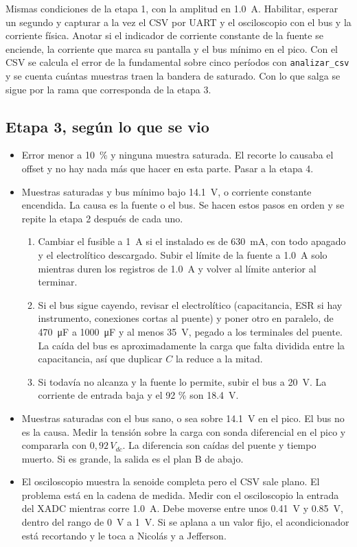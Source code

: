 \documentclass[11pt,a4paper]{article}
\begin{document}
Mismas condiciones de la etapa 1, con la amplitud en \SI{1.0}{A}. Habilitar, esperar un segundo y capturar a la vez el CSV por UART y el osciloscopio con el bus y la corriente física. Anotar si el indicador de corriente constante de la fuente se enciende, la corriente que marca su pantalla y el bus mínimo en el pico. Con el CSV se calcula el error de la fundamental sobre cinco períodos con \texttt{analizar\_csv} y se cuenta cuántas muestras traen la bandera de saturado. Con lo que salga se sigue por la rama que corresponda de la etapa 3.

\subsection*{Etapa 3, según lo que se vio}

\begin{itemize}
\item Error menor a \SI{10}{\percent} y ninguna muestra saturada. El recorte lo causaba el offset y no hay nada más que hacer en esta parte. Pasar a la etapa 4.
\item Muestras saturadas y bus mínimo bajo \SI{14.1}{V}, o corriente constante encendida. La causa es la fuente o el bus. Se hacen estos pasos en orden y se repite la etapa 2 después de cada uno.
  \begin{enumerate}
  \item Cambiar el fusible a \SI{1}{A} si el instalado es de \SI{630}{mA}, con todo apagado y el electrolítico descargado. Subir el límite de la fuente a \SI{1.0}{A} solo mientras duren los registros de \SI{1.0}{A} y volver al límite anterior al terminar.
  \item Si el bus sigue cayendo, revisar el electrolítico (capacitancia, ESR si hay instrumento, conexiones cortas al puente) y poner otro en paralelo, de \SI{470}{\micro F} a \SI{1000}{\micro F} y al menos \SI{35}{V}, pegado a los terminales del puente. La caída del bus es aproximadamente la carga que falta dividida entre la capacitancia, así que duplicar $C$ la reduce a la mitad.
  \item Si todavía no alcanza y la fuente lo permite, subir el bus a \SI{20}{V}. La corriente de entrada baja y el 92 \% son \SI{18.4}{V}.
  \end{enumerate}
\item Muestras saturadas con el bus sano, o sea sobre \SI{14.1}{V} en el pico. El bus no es la causa. Medir la tensión sobre la carga con sonda diferencial en el pico y compararla con $0{,}92\,V_{dc}$. La diferencia son caídas del puente y tiempo muerto. Si es grande, la salida es el plan B de abajo.
\item El osciloscopio muestra la senoide completa pero el CSV sale plano. El problema está en la cadena de medida. Medir con el osciloscopio la entrada del XADC mientras corre \SI{1.0}{A}. Debe moverse entre unos \SI{0.41}{V} y \SI{0.85}{V}, dentro del rango de \SI{0}{V} a \SI{1}{V}. Si se aplana a un valor fijo, el acondicionador está recortando y le toca a Nicolás y a Jefferson.
\end{itemize}
\end{document}
